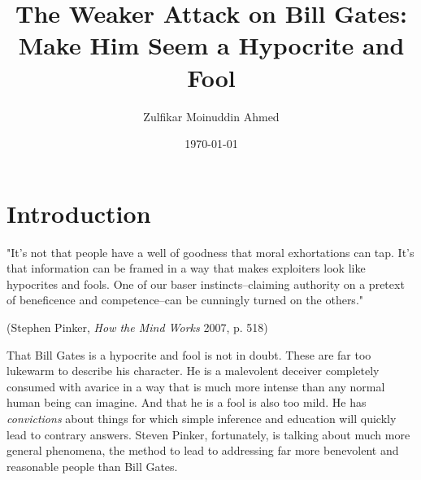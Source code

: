 \documentclass{amsart}
\title{The Weaker Attack on Bill Gates: Make Him Seem a Hypocrite and Fool}
\author{Zulfikar Moinuddin Ahmed}
\date{\today}
\begin{document}
\maketitle
\section{Introduction}

"It's not that people have a well of goodness that moral exhortations can tap.  It's that information can be framed in a way that makes exploiters look like hypocrites and fools.  One of our baser instincts--claiming authority on a pretext of beneficence and competence--can be cunningly turned on the others."

(Stephen Pinker, {\em How the Mind Works} 2007, p. 518)

That Bill Gates is a hypocrite and fool is not in doubt.  These are far too lukewarm to describe his character.  He is a malevolent deceiver completely consumed with avarice in a way that is much more intense than any normal human being can imagine.  And that he is a fool is also too mild.  He has {\em convictions} about things for which simple inference and education will quickly lead to contrary answers.  Steven Pinker, fortunately, is talking about much more general phenomena, the method to lead to addressing far more benevolent and reasonable people than Bill Gates.  
\end{document}
